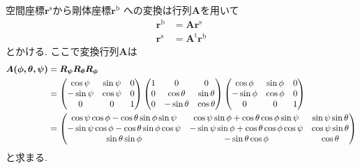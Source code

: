空間座標$\bm{r}^{\mathrm{s}}$から剛体座標$\bm{r}^{\mathrm{b}}$
への変換は行列$\bm{A}$を用いて
\begin{align}
 \bm{r}^{\mathrm{b}} &= \bm{A} \bm{r}^{\mathrm{s}}
 \label{eq:RigidBodyMD2}
 \\
 \bm{r}^{\mathrm{s}} &= \bm{A}^{\mathrm{t}} \bm{r}^{\mathrm{b}}
 \label{eq:RigidBodyMD3}
\end{align}
とかける. ここで変換行列$\bm{A}$は
\begin{align}
 \bm{A(\phi,\theta,\psi)}
 &= \bm{R_{\psi}}\bm{R_{\theta}}\bm{R_{\phi}}
 \notag
 \\
 & =
 \begin{pmatrix}
    \cos\psi & \sin\psi & 0 \\ -\sin\psi & \cos\psi & 0 \\ 0 & 0 & 1
 \end{pmatrix}
 \begin{pmatrix}
    1 & 0 & 0 \\ 0 & \cos\theta & \sin\theta \\ 0 & -\sin\theta & \cos\theta
 \end{pmatrix}
 \begin{pmatrix}
    \cos\phi & \sin\phi & 0 \\ -\sin\phi & \cos\phi & 0 \\ 0 & 0 & 1
 \end{pmatrix}
 \notag
 \\
 & =
 \begin{pmatrix}
   \cos\psi \cos\phi - \cos\theta \sin\phi \sin\psi &  \cos\psi \sin\phi + \cos\theta \cos\phi \sin\psi  & \sin\psi \sin\theta \\
  -\sin\psi \cos\phi - \cos\theta \sin\phi \cos\psi & -\sin\psi \sin\phi + \cos\theta \cos\phi \cos\psi & \cos\psi \sin\theta  \\
  \sin\theta \sin\phi & -\sin\theta\cos\phi & \cos\theta
 \end{pmatrix}
 \label{eq:RigidBodyMD4}
\end{align}
と求まる. 

